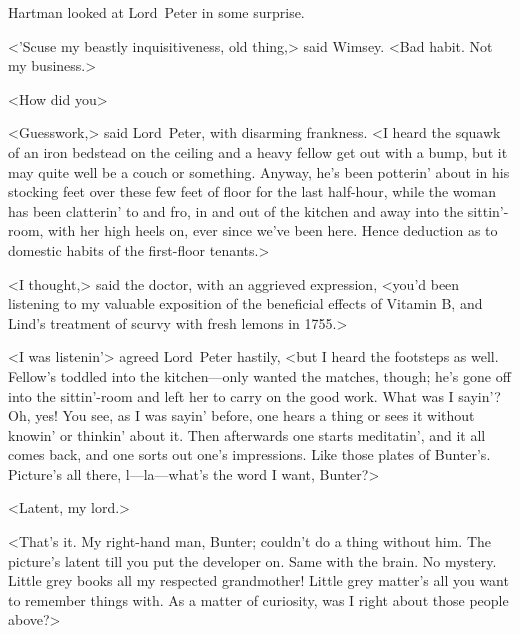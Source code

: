 Hartman looked at Lord~Peter in some surprise.

<'Scuse my beastly inquisitiveness, old thing,> said Wimsey. <Bad habit. Not my business.>

<How did you\longdash>

<Guesswork,> said Lord~Peter, with disarming frankness. <I heard the squawk of an iron bedstead on the ceiling and a heavy fellow get out with a bump, but it may quite well be a couch or something. Anyway, he's been potterin' about in his stocking feet over these few feet of floor for the last half-hour, while the woman has been clatterin' to and fro, in and out of the kitchen and away into the sittin'-room, with her high heels on, ever since we've been here. Hence deduction as to domestic habits of the first-floor tenants.>

<I thought,> said the doctor, with an aggrieved expression, <you'd been listening to my valuable exposition of the beneficial effects of Vitamin B, and Lind's treatment of scurvy with fresh lemons in 1755.>

<I was listenin'> agreed Lord~Peter hastily, <but I heard the footsteps as well. Fellow's toddled into the kitchen—only wanted the matches, though; he's gone off into the sittin'-room and left her to carry on the good work. What was I sayin'? Oh, yes! You see, as I was sayin' before, one hears a thing or sees it without knowin' or thinkin' about it. Then afterwards one starts meditatin', and it all comes back, and one sorts out one's impressions. Like those plates of Bunter's. Picture's all there, l—la—what's the word I want, Bunter?>

<Latent, my lord.>

<That's it. My right-hand man, Bunter; couldn't do a thing without him. The picture's latent till you put the developer on. Same with the brain. No mystery. Little grey books all my respected grandmother! Little grey matter's all you want to remember things with. As a matter of curiosity, was I right about those people above?>


